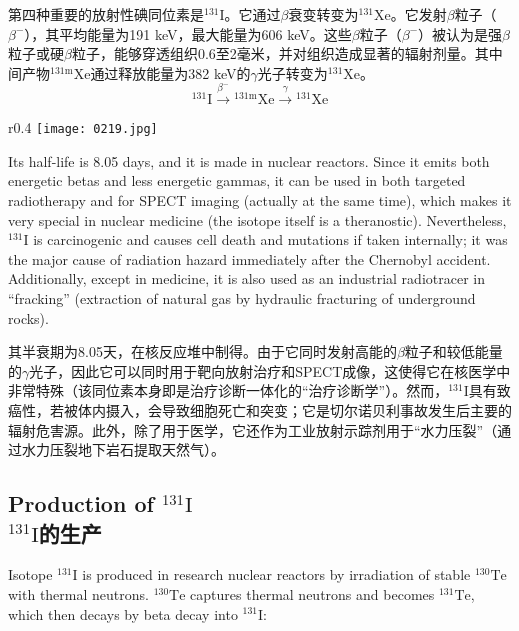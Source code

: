 \documentclass[dvipsnames, svgnames,a4paper,11pt]{article}
\begin{document}
第四种重要的放射性碘同位素是\(\mathrm{^{131}I}\)。它通过\(\beta\)衰变转变为\(\mathrm{^{131}Xe}\)。它发射\(\beta\)粒子（\(\beta^-\)），其平均能量为191 keV，最大能量为606 keV。这些\(\beta\)粒子（\(\beta^-\)）被认为是强\(\beta\)粒子或硬\(\beta\)粒子，能够穿透组织0.6至2毫米，并对组织造成显著的辐射剂量。其中间产物\(\mathrm{^{131m}Xe}\)通过释放能量为382 keV的$\gamma$光子转变为\(\mathrm{^{131}Xe}\)。
\[
\mathrm{^{131}I} \xrightarrow{\beta^-} \mathrm{^{131m}Xe} \xrightarrow{\gamma} \mathrm{^{131}Xe}
\]

\begin{wrapfigure}{r}{0.4\textwidth}
    \centering
    \texttt{[image: 0219.jpg]}
     \label{fig273}
\end{wrapfigure}

Its half-life is 8.05 days, and it is made in nuclear reactors. Since it emits both energetic betas and less energetic gammas, it can be used in both targeted radiotherapy and for SPECT imaging (actually at the same time), which makes it very special in nuclear medicine (the isotope itself is a theranostic). Nevertheless, \(\mathrm{^{131}I}\) is carcinogenic and causes cell death and mutations if taken internally; it was the major cause of radiation hazard immediately after the Chernobyl accident. Additionally, except in medicine, it is also used as an industrial radiotracer in “fracking” (extraction of natural gas by hydraulic fracturing of underground rocks).

其半衰期为8.05天，在核反应堆中制得。由于它同时发射高能的\(\beta\)粒子和较低能量的$\gamma$光子，因此它可以同时用于靶向放射治疗和SPECT成像，这使得它在核医学中非常特殊（该同位素本身即是治疗诊断一体化的“治疗诊断学”）。然而，\(\mathrm{^{131}I}\)具有致癌性，若被体内摄入，会导致细胞死亡和突变；它是切尔诺贝利事故发生后主要的辐射危害源。此外，除了用于医学，它还作为工业放射示踪剂用于“水力压裂”（通过水力压裂地下岩石提取天然气）。

\subsection{Production of \(\mathrm{^{131}I}\)\\ \(\mathrm{^{131}I}\)的生产}  
Isotope \(\mathrm{^{131}I}\) is produced in research nuclear reactors by irradiation of stable \(\mathrm{^{130}Te}\) with thermal neutrons. \(\mathrm{^{130}Te}\) captures thermal neutrons and becomes \(\mathrm{^{131}Te}\), which then decays by beta decay into \(\mathrm{^{131}I}\):
\end{document}
